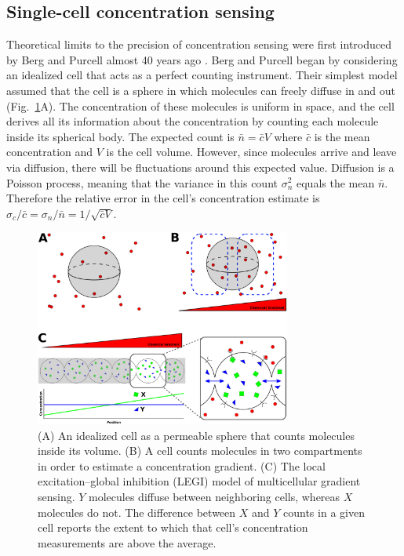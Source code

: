 \subsection{Single-cell concentration sensing}

Theoretical limits to the precision of concentration sensing were first introduced by Berg and Purcell almost 40 years ago \cite{berg1977physics}. Berg and Purcell began by considering an idealized cell that acts as a perfect counting instrument. Their simplest model assumed that the cell is a sphere in which molecules can freely diffuse in and out (Fig.\ \ref{sensing}A). The concentration of these molecules is uniform in space, and the cell derives all its information about the concentration by counting each molecule inside its spherical body. The expected count is
$\bar{n} = \bar{c}V$ where $\bar{c}$ is the mean concentration and $V$ is the cell volume.
However, since molecules arrive and leave via diffusion, there will be fluctuations around this expected value. Diffusion is a Poisson process, meaning that the variance in this count $\sigma_n^2$ equals the mean $\bar{n}$. Therefore the relative error in the cell's concentration estimate is
$\sigma_c/\bar{c} = \sigma_n/\bar{n} = 1/\sqrt{\bar{c} V}$.



\begin{figure}[tb]
    \centering
        \includegraphics[width=0.75\textwidth]{../fig/ch1_fig2.pdf}
    \caption{
    (A) An idealized cell as a permeable sphere that counts molecules inside its volume.
    (B) A cell counts molecules in two compartments in order to estimate a concentration gradient.
    (C) The local excitation--global inhibition (LEGI) model of multicellular gradient sensing. $Y$ molecules diffuse between neighboring cells, whereas $X$ molecules do not. The difference between $X$ and $Y$ counts in a given cell reports the extent to which that cell's concentration measurements are above the average.}
    \label{sensing}
\end{figure}



